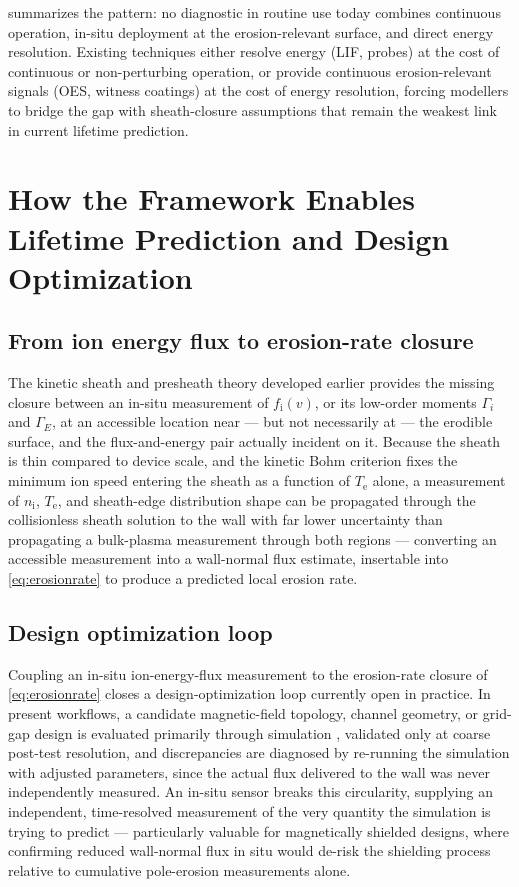  summarizes the pattern: no diagnostic in routine use today combines continuous operation, in-situ deployment at the erosion-relevant surface, and direct energy resolution. Existing techniques either resolve energy (LIF, probes) at the cost of continuous or non-perturbing operation, or provide continuous erosion-relevant signals (OES, witness coatings) at the cost of energy resolution, forcing modellers to bridge the gap with sheath-closure assumptions that remain the weakest link in current lifetime prediction.

\section{How the Framework Enables Lifetime Prediction and Design Optimization}
\label{sec:enabling}

\subsection{From ion energy flux to erosion-rate closure}

The kinetic sheath and presheath theory developed earlier provides the missing closure between an in-situ measurement of $f_{\mathrm{i}}(v)$, or its low-order moments $\Gamma_i$ and $\Gamma_{E}$, at an accessible location near — but not necessarily at — the erodible surface, and the flux-and-energy pair actually incident on it. Because the sheath is thin compared to device scale, and the kinetic Bohm criterion fixes the minimum ion speed entering the sheath as a function of $T_{\mathrm{e}}$ alone, a measurement of $n_{\mathrm{i}}$, $T_{\mathrm{e}}$, and sheath-edge distribution shape can be propagated through the collisionless sheath solution to the wall with far lower uncertainty than propagating a bulk-plasma measurement through both regions — converting an accessible measurement into a wall-normal flux estimate, insertable into \cref{eq:erosionrate} to produce a predicted local erosion rate.

\subsection{Design optimization loop}

Coupling an in-situ ion-energy-flux measurement to the erosion-rate closure of \cref{eq:erosionrate} closes a design-optimization loop currently open in practice. In present workflows, a candidate magnetic-field topology, channel geometry, or grid-gap design is evaluated primarily through simulation \cite{ref0433,ref0463}, validated only at coarse post-test resolution, and discrepancies are diagnosed by re-running the simulation with adjusted parameters, since the actual flux delivered to the wall was never independently measured. An in-situ sensor breaks this circularity, supplying an independent, time-resolved measurement of the very quantity the simulation is trying to predict — particularly valuable for magnetically shielded designs, where confirming reduced wall-normal flux in situ would de-risk the shielding process relative to cumulative pole-erosion measurements alone.

